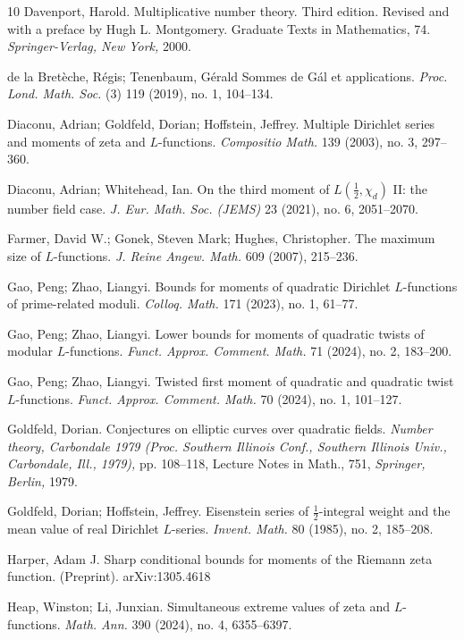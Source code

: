 \documentclass[12pt,reqno]{amsart}
\numberwithin{equation}{section}
\theoremstyle{plain}
\theoremstyle{definition}
\theoremstyle{remark}
\begin{document}
\begin{thebibliography}{10}
Davenport, Harold.
Multiplicative number theory. Third edition. Revised and with a preface by Hugh L. Montgomery. Graduate Texts in Mathematics, 74.
\emph{Springer-Verlag, New York,} 2000.

de la Bret\`eche, R\'egis; Tenenbaum, G\'erald Sommes de G\'al et applications.
\emph{Proc. Lond. Math. Soc.} (3) 119 (2019), no. 1, 104--134.

Diaconu, Adrian; Goldfeld, Dorian; Hoffstein, Jeffrey.
Multiple Dirichlet series and moments of zeta and $L$-functions.
\emph{Compositio Math.} 139 (2003), no. 3, 297--360.

Diaconu, Adrian; Whitehead, Ian.
On the third moment of $L(\frac{1}{2},\chi_d)$ II: the number field case.
\emph{J. Eur. Math. Soc. (JEMS)} 23 (2021), no. 6, 2051--2070.

Farmer, David W.; Gonek, Steven Mark; Hughes, Christopher.
The maximum size of $L$-functions.
\emph{J. Reine Angew. Math.} 609 (2007), 215--236.

Gao, Peng; Zhao, Liangyi.
Bounds for moments of quadratic Dirichlet $L$-functions of prime-related moduli.
\emph{Colloq. Math.} 171 (2023), no. 1, 61--77.

Gao, Peng; Zhao, Liangyi.
Lower bounds for moments of quadratic twists of modular $L$-functions.
\emph{Funct. Approx. Comment. Math.} 71 (2024), no. 2, 183--200.

Gao, Peng; Zhao, Liangyi.
Twisted first moment of quadratic and quadratic twist $L$-functions.
\emph{Funct. Approx. Comment. Math.}
70 (2024), no. 1, 101--127.

Goldfeld, Dorian.
Conjectures on elliptic curves over quadratic fields.
\emph{Number theory, Carbondale 1979 (Proc. Southern Illinois Conf., Southern Illinois Univ., Carbondale, Ill., 1979),} pp. 108–118, Lecture Notes in Math., 751, \emph{Springer, Berlin,} 1979.

Goldfeld, Dorian; Hoffstein, Jeffrey.
Eisenstein series of $\frac{1}{2}$-integral weight and the mean value of real Dirichlet $L$-series.
\emph{Invent. Math.} 80 (1985), no. 2, 185--208.

Harper, Adam J.
Sharp conditional bounds for moments of the Riemann zeta function.
(Preprint).
arXiv:1305.4618

Heap, Winston; Li, Junxian.
Simultaneous extreme values of zeta and $L$-functions.
\emph{Math. Ann.} 390 (2024), no. 4, 6355--6397.


\end{thebibliography}
\end{document}
